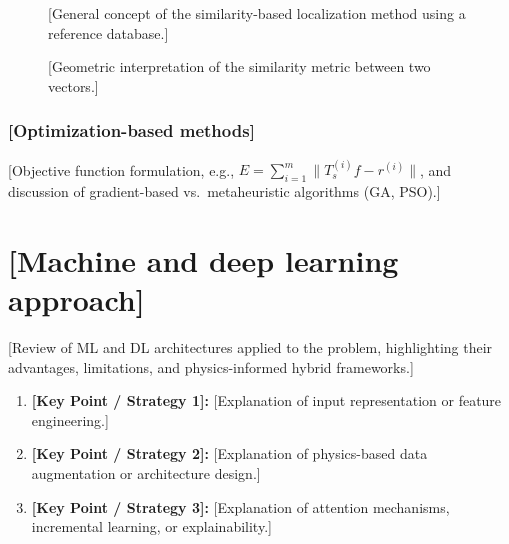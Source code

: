 \documentclass[final,5p,times,twocolumn]{elsarticle}
\begin{document}
\begin{figure}[t]
    \centering
    \caption{[General concept of the similarity-based localization method using a reference database.]}
    \label{fig:crosscorr}
\end{figure}

\begin{figure}[t]
    \centering
    \caption{[Geometric interpretation of the similarity metric between two vectors.]}
    \label{fig:cosine}
\end{figure}

\subsubsection{[Optimization-based methods]}\label{subsubsec:sec3_2_2}

[Objective function formulation, e.g., $E = \sum_{i=1}^{m} \| T_{s}^{(i)} f - r^{(i)} \|$, and discussion of gradient-based vs.\ metaheuristic algorithms (GA, PSO).]

\section{[Machine and deep learning approach]}\label{sec:sec4}

[Review of ML and DL architectures applied to the problem, highlighting their advantages, limitations, and physics-informed hybrid frameworks.]

\begin{enumerate}
    \item \textbf{[Key Point / Strategy 1]:} [Explanation of input representation or feature engineering.]
    \item \textbf{[Key Point / Strategy 2]:} [Explanation of physics-based data augmentation or architecture design.]
    \item \textbf{[Key Point / Strategy 3]:} [Explanation of attention mechanisms, incremental learning, or explainability.]
\end{enumerate}
\end{document}
